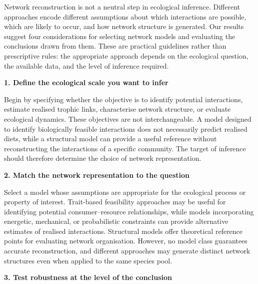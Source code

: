 \documentclass[
]{article}
\begin{document}
\begin{tcolorbox}[enhanced jigsaw, arc=.35mm, bottomrule=.15mm, bottomtitle=1mm, breakable, colback=white, colbacktitle=quarto-callout-note-color!10!white, colframe=quarto-callout-note-color-frame, coltitle=black, left=2mm, leftrule=.75mm, opacityback=0, opacitybacktitle=0.6, rightrule=.15mm, title=\textcolor{quarto-callout-note-color}{\faInfo}\hspace{0.5em}{Matching network models to ecological questions}, titlerule=0mm, toprule=.15mm, toptitle=1mm]

Network reconstruction is not a neutral step in ecological inference.
Different approaches encode different assumptions about which
interactions are possible, which are likely to occur, and how network
structure is generated. Our results suggest four considerations for
selecting network models and evaluating the conclusions drawn from them.
These are practical guidelines rather than prescriptive rules: the
appropriate approach depends on the ecological question, the available
data, and the level of inference required.

\textbf{1. Define the ecological scale you want to infer}

Begin by specifying whether the objective is to identify potential
interactions, estimate realised trophic links, characterise network
structure, or evaluate ecological dynamics. These objectives are not
interchangeable. A model designed to identify biologically feasible
interactions does not necessarily predict realised diets, while a
structural model can provide a useful reference without reconstructing
the interactions of a specific community. The target of inference should
therefore determine the choice of network representation.

\textbf{2. Match the network representation to the question}

Select a model whose assumptions are appropriate for the ecological
process or property of interest. Trait-based feasibility approaches may
be useful for identifying potential consumer--resource relationships,
while models incorporating energetic, mechanical, or probabilistic
constraints can provide alternative estimates of realised interactions.
Structural models offer theoretical reference points for evaluating
network organisation. However, no model class guarantees accurate
reconstruction, and different approaches may generate distinct network
structures even when applied to the same species pool.

\textbf{3. Test robustness at the level of the conclusion}


\end{tcolorbox}
\end{document}
